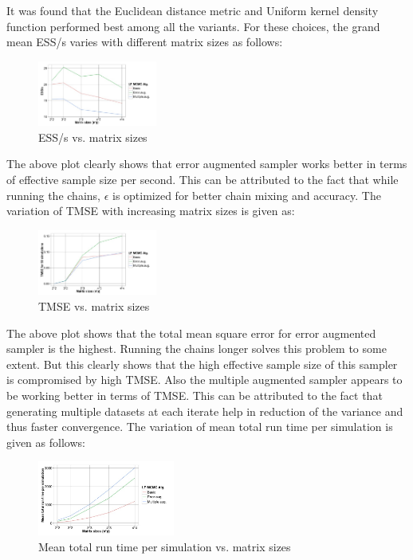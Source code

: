 \begin{multicols}{2}
It was found that the Euclidean distance metric and Uniform kernel density function performed best among all the variants. For these choices, the grand mean ESS/s varies with different matrix sizes as follows:

\begin{figure}[H]
  \centering
    \includegraphics[width=0.35\textwidth]{plot1.jpeg}
    \caption{ESS/s vs. matrix sizes}
    \label{BN}
\end{figure}

The above plot clearly shows that error augmented sampler works better in terms of effective sample size per second. This can be attributed to the fact that while running the chains, $\epsilon$ is optimized for better chain mixing and accuracy. The variation of TMSE with increasing matrix sizes is given as:
\begin{figure}[H]
  \centering
    \includegraphics[width=0.35\textwidth]{plot2.jpeg}
    \caption{TMSE vs. matrix sizes}
    \label{BN}
\end{figure}

The above plot shows that the total mean square error for error augmented sampler is the highest. Running the chains longer solves this problem to some extent. But this clearly shows that the high effective sample size of this sampler is compromised by high TMSE. Also the multiple augmented sampler appears to be working better in terms of TMSE. This can be attributed to the fact that generating multiple datasets at each iterate help in reduction of the variance and thus faster convergence. The variation of mean total run time per simulation is given as follows:

\begin{figure}[H]
  \centering
    \includegraphics[width=0.40\textwidth]{plot3.jpeg}
    \caption{Mean total run time per simulation vs. matrix sizes}
    \label{BN}
\end{figure}


\end{multicols}
